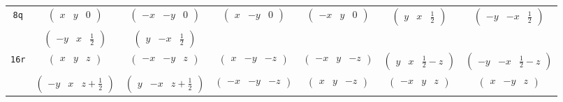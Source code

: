 \documentclass[fleqn,9pt,landscape]{jsarticle}
\begin{document}
\begin{center}
\begin{longtable}{ccccccc}
{\tt 8q} & $ \begin{pmatrix} x & y & 0 \end{pmatrix} $ & $ \begin{pmatrix} - x & - y & 0 \end{pmatrix} $ & $ \begin{pmatrix} x & - y & 0 \end{pmatrix} $ & $ \begin{pmatrix} - x & y & 0 \end{pmatrix} $ & $ \begin{pmatrix} y & x & \frac{1}{2} \end{pmatrix} $ & $ \begin{pmatrix} - y & - x & \frac{1}{2} \end{pmatrix} $ \\
& $ \begin{pmatrix} - y & x & \frac{1}{2} \end{pmatrix} $ & $ \begin{pmatrix} y & - x & \frac{1}{2} \end{pmatrix} $ & $  $ & $  $ & $  $ & $  $ \\ \hline
{\tt 16r} & $ \begin{pmatrix} x & y & z \end{pmatrix} $ & $ \begin{pmatrix} - x & - y & z \end{pmatrix} $ & $ \begin{pmatrix} x & - y & - z \end{pmatrix} $ & $ \begin{pmatrix} - x & y & - z \end{pmatrix} $ & $ \begin{pmatrix} y & x & \frac{1}{2} - z \end{pmatrix} $ & $ \begin{pmatrix} - y & - x & \frac{1}{2} - z \end{pmatrix} $ \\
& $ \begin{pmatrix} - y & x & z + \frac{1}{2} \end{pmatrix} $ & $ \begin{pmatrix} y & - x & z + \frac{1}{2} \end{pmatrix} $ & $ \begin{pmatrix} - x & - y & - z \end{pmatrix} $ & $ \begin{pmatrix} x & y & - z \end{pmatrix} $ & $ \begin{pmatrix} - x & y & z \end{pmatrix} $ & $ \begin{pmatrix} x & - y & z \end{pmatrix} $ \\

\end{longtable}
\end{center}
\end{document}
